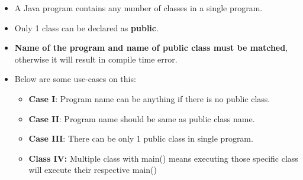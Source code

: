 \begin{flushleft}
	
	\begin{itemize}
		\item A Java program contains any number of classes in a single program. 
		\item Only 1 class can be declared as \textbf{public}.
		\item \textbf{Name of the program and name of public class must be matched}, otherwise it will result in compile time error.
		\item Below are some use-cases on this:
		
		\begin{itemize}
			\item \textbf{Case I}: Program name can be anything if there is no public class.
			\bigskip
			\bigskip
			
			\bigskip
			\item \textbf{Case II}: Program name should be same as public class name.
			\bigskip
			\bigskip
			
			\bigskip
			\item \textbf{Case III}: There can be only 1 public class in single program.
			\bigskip

			\item \textbf{Class IV:} Multiple class with main() means executing those specific class will execute their respective main()
			\bigskip
		

\end{itemize}
\end{itemize}
\end{flushleft}
